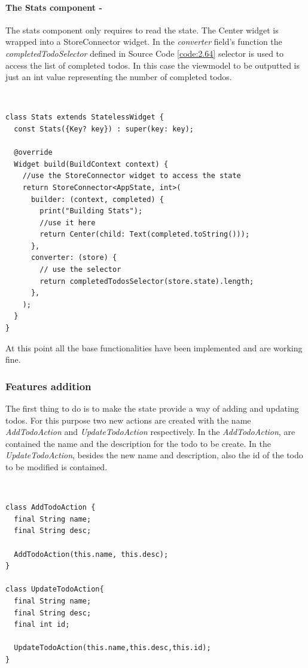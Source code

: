 \paragraph{The Stats component - }
\label{subpar:todo_app_bloc_core_state}
The stats component only requires to read the state. The Center widget is wrapped into a StoreConnector widget. In the \textit{converter} field's function the \textit{completedTodoSelector} defined in Source Code \ref{code:2.64} selector is used to access the list of completed todos. In this case the viewmodel to be outputted is just an int value representing the number of completed todos.
\begin{code}
\mbox{}\\
 \mbox{}
		\label{code:2.14}
\begin{verbatim}
class Stats extends StatelessWidget {
  const Stats({Key? key}) : super(key: key);

  @override
  Widget build(BuildContext context) {
    //use the StoreConnector widget to access the state
    return StoreConnector<AppState, int>(
      builder: (context, completed) {
        print("Building Stats");
        //use it here
        return Center(child: Text(completed.toString()));
      },
      converter: (store) {
        // use the selector
        return completedTodosSelector(store.state).length;
      },
    );
  }
}
\end{verbatim}
\mbox{}
\end{code}

At this point all the base functionalities have been implemented and are working fine.
 

\subsubsection{Features addition}  \label{par:todo_app_inherited_widget_introduction}

The first thing to do is to make the state provide a way of adding and updating todos. For this purpose two new actions are created with the name \textit{AddTodoAction} and \textit{UpdateTodoAction} respectively. In the \textit{AddTodoAction}, are contained the name and the description for the todo to be create. In the \textit{UpdateTodoAction}, besides the new name and description, also the id of the todo to be modified is contained.
\begin{code}
\mbox{}\\
 \mbox{}
		\label{code:2.14}
\begin{verbatim}
class AddTodoAction {
  final String name;
  final String desc;

  AddTodoAction(this.name, this.desc);
}

class UpdateTodoAction{
  final String name;
  final String desc;
  final int id;

  UpdateTodoAction(this.name,this.desc,this.id);
}
\end{verbatim}
\mbox{}
\end{code}


